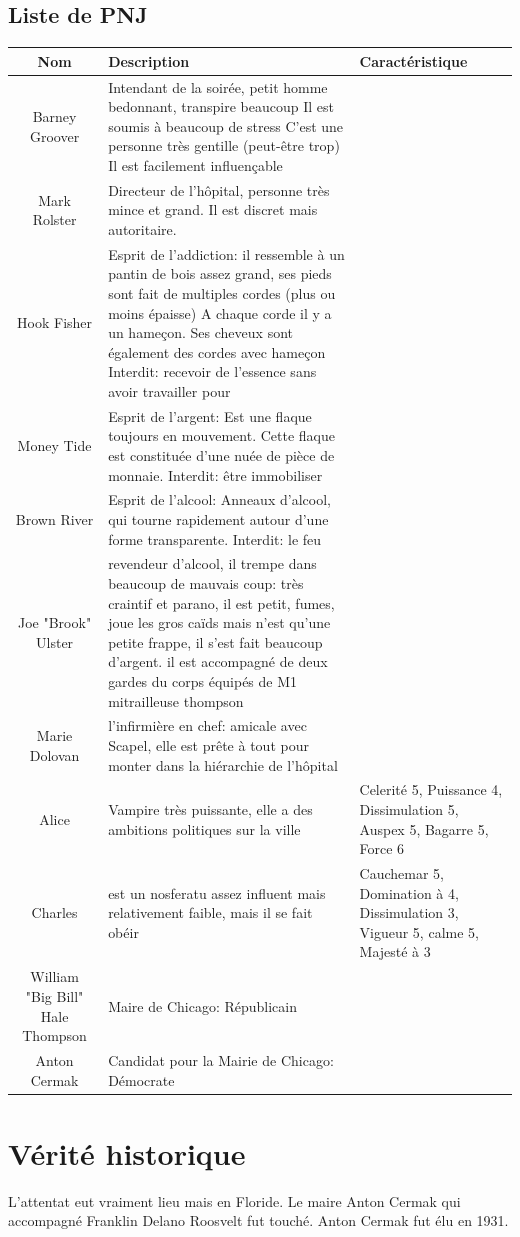 \documentclass[oneside,12pt]{book}
\begin{document}
\begin{flushleft}
\section{Liste de PNJ}
\begin{tabularx}{19cm}{|c|X|X|}
  \hline
  Nom & Description & Caractéristique \\
  \hline
  Barney Groover & Intendant de la soirée, petit homme bedonnant, transpire beaucoup  Il est soumis à beaucoup de stress C'est une personne très gentille (peut-être trop) Il est facilement influençable &   \\
\hline
  Mark Rolster & Directeur de l'hôpital, personne très mince et grand. Il est discret mais autoritaire. &  \\
\hline
  Hook Fisher & Esprit de l'addiction: il ressemble à un pantin de bois assez grand, ses pieds sont fait de multiples cordes (plus ou moins épaisse) A chaque corde il y a un hameçon. Ses cheveux sont également des cordes avec hameçon Interdit: recevoir de l'essence sans avoir travailler pour   &  \\
\hline
  Money Tide & Esprit de l'argent: Est une flaque toujours en mouvement. Cette flaque est constituée d'une nuée de pièce de monnaie. Interdit: être immobiliser &  \\
\hline
  Brown River & Esprit de l'alcool: Anneaux d'alcool, qui tourne rapidement autour d'une forme transparente. Interdit: le feu &  \\
\hline
  Joe "Brook" Ulster & revendeur d'alcool, il trempe dans beaucoup de mauvais coup: très craintif et parano, il est petit, fumes, joue les gros caïds  mais n'est qu'une petite frappe, il s'est fait beaucoup d'argent. il est accompagné de deux gardes du corps équipés de M1 mitrailleuse thompson &  \\
\hline
Marie Dolovan & l'infirmière en chef: amicale avec Scapel, elle est prête à tout pour monter dans la hiérarchie de l'hôpital & \\ 
\hline
Alice & Vampire très puissante, elle a des ambitions politiques sur la ville & Celerité 5, Puissance 4, Dissimulation 5, Auspex 5, Bagarre 5, Force 6 \\ 
\hline
Charles & est un nosferatu assez influent mais relativement faible, mais il se fait obéir & Cauchemar 5, Domination à 4, Dissimulation 3,  Vigueur 5, calme 5, Majesté à 3    \\ 
\hline
William "Big Bill" Hale Thompson & Maire de Chicago: Républicain &  \\ 
\hline
Anton Cermak & Candidat pour la Mairie de Chicago: Démocrate &   \\ 
\hline
\end{tabularx}





\chapter{Vérité historique}
L'attentat eut vraiment lieu mais en Floride. Le maire Anton Cermak qui accompagné Franklin Delano Roosvelt fut touché. Anton Cermak fut élu en 1931.





\end{flushleft}
\end{document}
